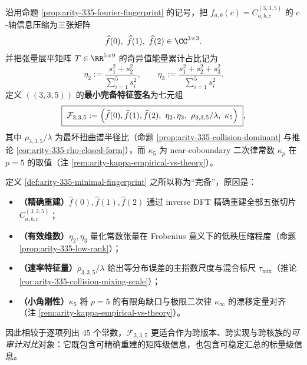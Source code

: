 \begin{definition}\label{def:arity-335-minimal-fingerprint}
沿用命题 \ref{prop:arity-335-fourier-fingerprint} 的记号，把 \(f_{a,b}(c)=C^{(3,3,5)}_{a,b,c}\) 的 \(c\)-轴信息压缩为三张矩阵
\[
\widehat f(0),\ \widehat f(1),\ \widehat f(2)\in\CC^{3\times 3}.
\]
并把张量展平矩阵 \(T\in\RR^{5\times 9}\) 的奇异值能量累计占比记为
\[
\eta_2:=\frac{s_1^2+s_2^2}{\sum_{i=1}^5 s_i^2},
\qquad
\eta_3:=\frac{s_1^2+s_2^2+s_3^2}{\sum_{i=1}^5 s_i^2}.
\]
定义 \(((3,3,5))\) 的\textbf{最小完备特征签名}为七元组
\[
\boxed{\;
\mathcal{F}_{3,3,5}:=
\Bigl(\widehat f(0),\widehat f(1),\widehat f(2),\ \eta_2,\eta_3,\ \rho_{3,3,5}/\lambda,\ \kappa_5\Bigr)\;},
\]
其中 \(\rho_{3,3,5}/\lambda\) 为最坏扭曲谱半径比（命题 \ref{prop:arity-335-collision-dominant} 与推论 \ref{cor:arity-335-rho-closed-form}），而 \(\kappa_5\) 为 near-coboundary 二次律常数 \(\kappa_p\) 在 \(p=5\) 的取值（注 \ref{rem:arity-kappa-empirical-vs-theory}）。
\end{definition}

\begin{remark}\label{rem:arity-335-minimal-fingerprint-complete}
定义 \ref{def:arity-335-minimal-fingerprint} 之所以称为“完备”，原因是：
\begin{itemize}
  \item \textbf{（精确重建）}\(\widehat f(0),\widehat f(1),\widehat f(2)\) 通过 inverse DFT 精确重建全部五张切片 \(C^{(3,3,5)}_{a,b,c}\)；
  \item \textbf{（有效维数）}\(\eta_2,\eta_3\) 量化常数张量在 Frobenius 意义下的低秩压缩程度（命题 \ref{prop:arity-335-low-rank}）；
\item \textbf{（速率特征量）}\(\rho_{3,3,5}/\lambda\) 给出等分布误差的主指数尺度与混合标尺 \(\tau_{\mathrm{mix}}\)（推论 \ref{cor:arity-335-collision-mixing-scale}）；
  \item \textbf{（小角刚性）}\(\kappa_5\) 将 \(p=5\) 的有限角缺口与极限二次律 \(\kappa_\infty\) 的漂移定量对齐（注 \ref{rem:arity-kappa-empirical-vs-theory}）。
\end{itemize}
因此相较于逐项列出 \(45\) 个常数，\(\mathcal{F}_{3,3,5}\) 更适合作为跨版本、跨实现与跨核族的\emph{可审计对比}对象：它既包含可精确重建的矩阵级信息，也包含可稳定汇总的标量级信息。
\end{remark}

